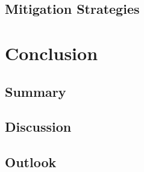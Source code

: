 \documentclass[runningheads]{llncs}
\begin{document}
\subsection{Mitigation Strategies}

\section{Conclusion}
\subsection{Summary}
\subsection{Discussion}
\subsection{Outlook}



%
%
%
% 
% 
%

\printbibliography
\end{document}
